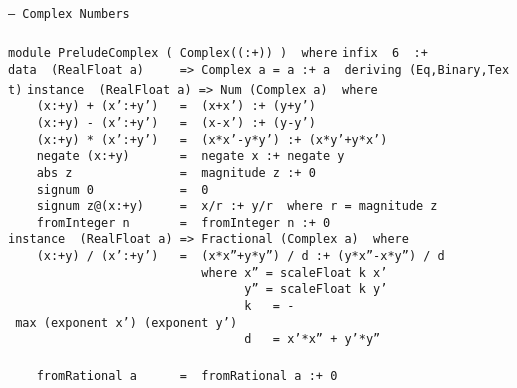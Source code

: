 \noindent\bprogB
\mbox{\tt --\ Complex\ Numbers}\\
\mbox{\tt }\\[-8pt]
\mbox{\tt module\ PreludeComplex\ (\ Complex((:+))\ )\ \ where}
%
\eprogB\noindent\bprogB
\mbox{\tt infix\ \ 6\ \ :+}
%
\eprogB\noindent\bprogB
\mbox{\tt data\ \ (RealFloat\ a)\ \ \ \ \ =>\ Complex\ a\ =\ a\ :+\ a\ \ deriving\ (Eq,Binary,Text)}
\eprogB\noindent\bprogB
\mbox{\tt instance\ \ (RealFloat\ a)\ =>\ Num\ (Complex\ a)\ \ where}\\
\mbox{\tt \ \ \ \ (x:+y)\ +\ (x':+y')\ \ \ =\ \ (x+x')\ :+\ (y+y')}\\
\mbox{\tt \ \ \ \ (x:+y)\ -\ (x':+y')\ \ \ =\ \ (x-x')\ :+\ (y-y')}\\
\mbox{\tt \ \ \ \ (x:+y)\ *\ (x':+y')\ \ \ =\ \ (x*x'-y*y')\ :+\ (x*y'+y*x')}\\
\mbox{\tt \ \ \ \ negate\ (x:+y)\ \ \ \ \ \ \ =\ \ negate\ x\ :+\ negate\ y}\\
\mbox{\tt \ \ \ \ abs\ z\ \ \ \ \ \ \ \ \ \ \ \ \ \ \ =\ \ magnitude\ z\ :+\ 0}\\
\mbox{\tt \ \ \ \ signum\ 0\ \ \ \ \ \ \ \ \ \ \ \ =\ \ 0}\\
\mbox{\tt \ \ \ \ signum\ z@(x:+y)\ \ \ \ \ =\ \ x/r\ :+\ y/r\ \ where\ r\ =\ magnitude\ z}\\
\mbox{\tt \ \ \ \ fromInteger\ n\ \ \ \ \ \ \ =\ \ fromInteger\ n\ :+\ 0}
%
\eprogB\noindent\bprogB
\mbox{\tt instance\ \ (RealFloat\ a)\ =>\ Fractional\ (Complex\ a)\ \ where}\\
\mbox{\tt \ \ \ \ (x:+y)\ /\ (x':+y')\ \ \ =\ \ (x*x''+y*y'')\ /\ d\ :+\ (y*x''-x*y'')\ /\ d}\\
\mbox{\tt \ \ \ \ \ \ \ \ \ \ \ \ \ \ \ \ \ \ \ \ \ \ \ \ \ \ \ where\ x''\ =\ scaleFloat\ k\ x'}\\
\mbox{\tt \ \ \ \ \ \ \ \ \ \ \ \ \ \ \ \ \ \ \ \ \ \ \ \ \ \ \ \ \ \ \ \ \ y''\ =\ scaleFloat\ k\ y'}\\
\mbox{\tt \ \ \ \ \ \ \ \ \ \ \ \ \ \ \ \ \ \ \ \ \ \ \ \ \ \ \ \ \ \ \ \ \ k\ \ \ =\ -\ max\ (exponent\ x')\ (exponent\ y')}\\
\mbox{\tt \ \ \ \ \ \ \ \ \ \ \ \ \ \ \ \ \ \ \ \ \ \ \ \ \ \ \ \ \ \ \ \ \ d\ \ \ =\ x'*x''\ +\ y'*y''}\\
\mbox{\tt }\\[-8pt]
\mbox{\tt \ \ \ \ fromRational\ a\ \ \ \ \ \ =\ \ fromRational\ a\ :+\ 0}
%
